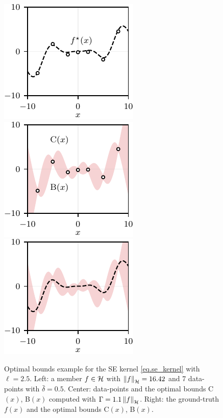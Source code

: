 \begin{figure}[b]
	\centering
	\includegraphics{../images/chap2_ex_opt_bounds_gt_samples.pdf} \hspace{0pt}
	\includegraphics{../images/chap2_ex_opt_bounds_bound_samples.pdf} \hspace{0pt}
	\includegraphics{../images/chap2_ex_opt_bounds_bound_gt.pdf} \hspace{0pt}
	\caption{Optimal bounds example for the SE kernel \eqref{eq.se_kernel} with $\ell=2.5$. Left: a member $f\in\mathcal{H}$ with $\left\| f \right\|_\mathcal{H}=16.42$ and 7 data-points with $\bar\delta =0.5$. Center: data-points and the optimal bounds C$(x)$, B$(x)$ computed with $\Gamma=1.1\left\| f \right\|_\mathcal{H}$. Right: the ground-truth $f(x)$ and the optimal bounds C$(x)$, B$(x)$.}
	\label{fig.ex_opt_bounds}
\end{figure}

